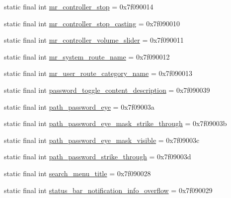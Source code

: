 \begin{CompactItemize}
static final int \hyperlink{classandroid_1_1support_1_1graphics_1_1drawable_1_1animated_1_1_r_1_1string_45f90d7a6159c4ad03f332c5c85f659c}{mr\_\-controller\_\-stop} = 0x7f090014
\item 
static final int \hyperlink{classandroid_1_1support_1_1graphics_1_1drawable_1_1animated_1_1_r_1_1string_64642ac2c0038a1d93ee498e364fe969}{mr\_\-controller\_\-stop\_\-casting} = 0x7f090010
\item 
static final int \hyperlink{classandroid_1_1support_1_1graphics_1_1drawable_1_1animated_1_1_r_1_1string_ec1a9840e348e0c0bbfb4bfb3ed159e4}{mr\_\-controller\_\-volume\_\-slider} = 0x7f090011
\item 
static final int \hyperlink{classandroid_1_1support_1_1graphics_1_1drawable_1_1animated_1_1_r_1_1string_38c631122a2958e2824428b0e859f2c4}{mr\_\-system\_\-route\_\-name} = 0x7f090012
\item 
static final int \hyperlink{classandroid_1_1support_1_1graphics_1_1drawable_1_1animated_1_1_r_1_1string_4f479c26e1194538ae71aa04148de9eb}{mr\_\-user\_\-route\_\-category\_\-name} = 0x7f090013
\item 
static final int \hyperlink{classandroid_1_1support_1_1graphics_1_1drawable_1_1animated_1_1_r_1_1string_08d54739f7bf9c4b57dae529e565671c}{password\_\-toggle\_\-content\_\-description} = 0x7f090039
\item 
static final int \hyperlink{classandroid_1_1support_1_1graphics_1_1drawable_1_1animated_1_1_r_1_1string_dbda596419fbbc635b7a38b77a783044}{path\_\-password\_\-eye} = 0x7f09003a
\item 
static final int \hyperlink{classandroid_1_1support_1_1graphics_1_1drawable_1_1animated_1_1_r_1_1string_36ba3e826d8186f59b56e4a7b4eb5b6d}{path\_\-password\_\-eye\_\-mask\_\-strike\_\-through} = 0x7f09003b
\item 
static final int \hyperlink{classandroid_1_1support_1_1graphics_1_1drawable_1_1animated_1_1_r_1_1string_3ac4605592b7e7508013449862830079}{path\_\-password\_\-eye\_\-mask\_\-visible} = 0x7f09003c
\item 
static final int \hyperlink{classandroid_1_1support_1_1graphics_1_1drawable_1_1animated_1_1_r_1_1string_6ad1f7db8c8727a312efa2a28ad2b6f3}{path\_\-password\_\-strike\_\-through} = 0x7f09003d
\item 
static final int \hyperlink{classandroid_1_1support_1_1graphics_1_1drawable_1_1animated_1_1_r_1_1string_d3d39e68899e55f1e35aeae3238253b9}{search\_\-menu\_\-title} = 0x7f090028
\item 
static final int \hyperlink{classandroid_1_1support_1_1graphics_1_1drawable_1_1animated_1_1_r_1_1string_5f11fbb4d25d7bbaa799cf86fcbfbc0f}{status\_\-bar\_\-notification\_\-info\_\-overflow} = 0x7f090029
\end{CompactItemize}


